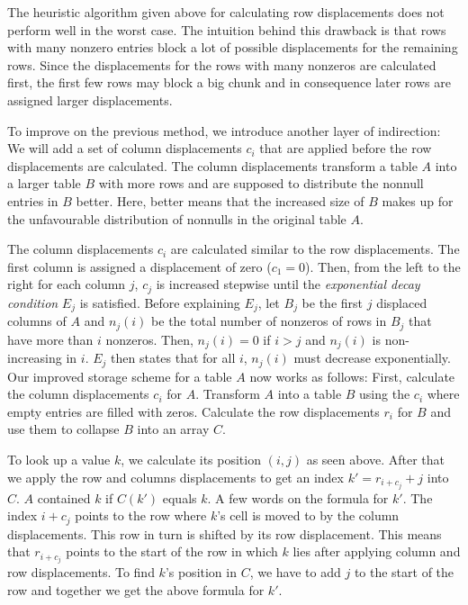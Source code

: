 The heuristic algorithm given above for calculating row displacements does not perform well in the worst case.
The intuition behind this drawback is that rows with many nonzero entries block a lot of possible displacements for the remaining rows.
Since the displacements for the rows with many nonzeros are calculated first, the first few rows may block a big chunk and in consequence later rows are assigned larger displacements.

To improve on the previous method, we introduce another layer of indirection:
We will add a set of column displacements $c_i$ that are applied before the row displacements are calculated.
The column displacements transform a table $A$ into a larger table $B$ with more rows and are supposed to distribute the nonnull entries in $B$ better.
Here, better means that the increased size of $B$ makes up for the unfavourable distribution of nonnulls in the original table $A$.

The column displacements $c_i$ are calculated similar to the row displacements.
The first column is assigned a displacement of zero ($c_1 = 0$).
Then, from the left to the right for each column $j$, $c_j$ is increased stepwise until the \emph{exponential decay condition} $E_j$ is satisfied.
Before explaining $E_j$, let $B_j$ be the first $j$ displaced columns of $A$ and $n_j(i)$ be the total number of nonzeros of rows in $B_j$ that have more than $i$ nonzeros.
Then, $n_j(i) = 0$ if $i > j$ and $n_j(i)$ is non-increasing in $i$.
$E_j$ then states that for all $i$, $n_j(i)$ must decrease exponentially.
Our improved storage scheme for a table $A$ now works as follows:
First, calculate the column displacements $c_i$ for $A$.
Transform $A$ into a table $B$ using the $c_i$ where empty entries are filled with zeros.
Calculate the row displacements $r_i$ for $B$ and use them to collapse $B$ into an array $C$.

To look up a value $k$, we calculate its position $(i, j)$ as seen above.
After that we apply the row and columns displacements to get an index $k' = r_{i + c_j} + j$ into $C$.
$A$ contained $k$ if $C(k')$ equals $k$.
A few words on the formula for $k'$.
The index $i + c_j$ points to the row where $k$'s cell is moved to by the column displacements.
This row in turn is shifted by its row displacement.
This means that $r_{i + c_j}$ points to the start of the row in which $k$ lies after applying column and row displacements.
To find $k$'s position in $C$, we have to add $j$ to the start of the row and together we get the above formula for $k'$.
